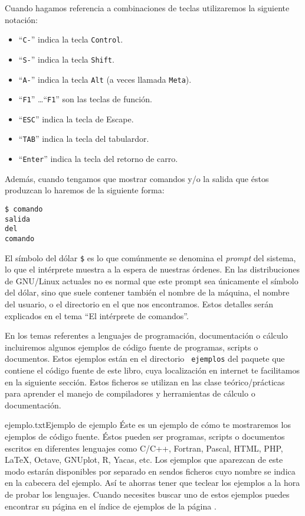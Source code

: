 Cuando hagamos  referencia a  combinaciones de teclas  utilizaremos la
siguiente notación:

\begin{itemize}
\item ``{\tt C-}'' indica la tecla {\tt Control}.
\item ``{\tt S-}'' indica la tecla {\tt Shift}.
\item ``{\tt A-}'' indica la tecla {\tt Alt} (a veces llamada {\tt Meta}).
\item ``{\tt F1}'' \dots ``{\tt F1}'' son las teclas de función.
\item ``{\tt ESC}'' indica la tecla de Escape.
\item ``{\tt TAB}'' indica la tecla del tabulardor.
\item ``{\tt Enter}'' indica la tecla del retorno de carro.
\end{itemize}

Además, cuando tengamos  que mostrar comandos y/o la  salida que éstos
produzcan lo haremos de la siguiente forma:

\begin{verbatim}
$ comando
salida
del
comando
\end{verbatim}

El símbolo del dólar \verb+$+ es lo que comúnmente se denomina el {\em
prompt}  del sistema,  lo que  el intérprete  muestra a  la espera  de
nuestras órdenes.  En las distribuciones  de GNU/Linux actuales  no es
normal que este  prompt sea únicamente el símbolo del  dólar, sino que
suele contener también el nombre de la máquina, el nombre del usuario,
o  el directorio  en  el  que nos  encontramos.  Estos detalles  serán
explicados en el tema ``El intérprete de comandos''.

En los temas  referentes a lenguajes de  programación, documentación o
cálculo incluiremos  algunos ejemplos  de código fuente  de programas,
scripts  o documentos.  Estos  ejemplos están  en  el directorio  {\tt
ejemplos} del  paquete que  contiene el código  fuente de  este libro,
cuya localización en internet te  facilitamos en la siguiente sección.
Estos  ficheros  se  utilizan  en  las  clase  teórico/prácticas  para
aprender  el  manejo  de  compiladores y  herramientas  de  cálculo  o
documentación.

\newpage

\begin{ejemplo}{ejemplo.txt}{Ejemplo de ejemplo}
Éste  es un  ejemplo de  cómo te  mostraremos los  ejemplos de  código
fuente. Éstos pueden  ser programas, scripts o  documentos escritos en
diferentes lenguajes  como C/C++, Fortran, Pascal,  HTML, PHP, \LaTeX,
Octave, GNUplot,  R, Yacas,  etc. Los ejemplos  que aparezcan  de este
modo estarán disponibles  por separado en sendos  ficheros cuyo nombre
se indica en la cabecera del ejemplo. Así te ahorras tener que teclear
los  ejemplos a  la hora  de  probar los  lenguajes. Cuando  necesites
buscar uno de  estos ejemplos puedes encontrar su página  en el índice
de ejemplos de la página \pageref{IndiceDeEjemplos}.
\end{ejemplo}

